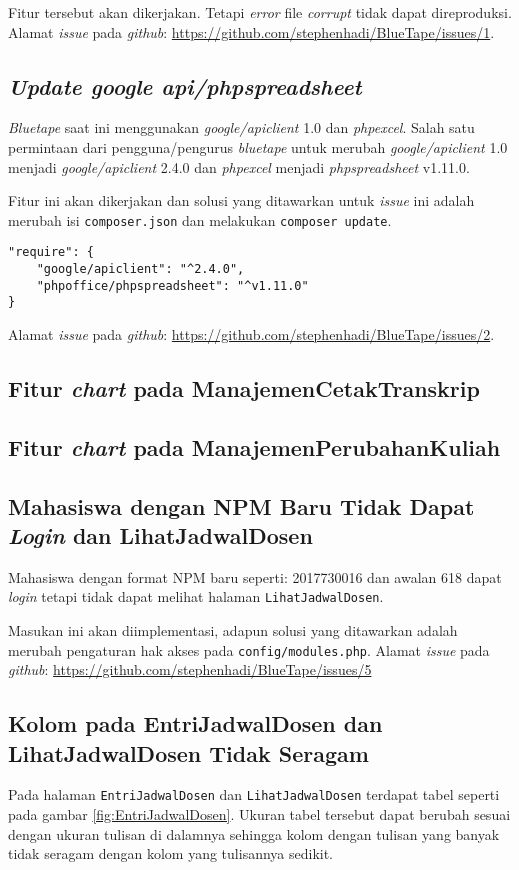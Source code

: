 Fitur tersebut akan dikerjakan. Tetapi \textit{error} file \textit{corrupt} tidak dapat direproduksi. Alamat \textit{issue} pada \textit{github}: \url{https://github.com/stephenhadi/BlueTape/issues/1}. 

\subsection{\textit{Update google api/phpspreadsheet}}
\label{issue:2}
\textit{Bluetape} saat ini menggunakan \textit{google/apiclient} 1.0 dan \textit{phpexcel}. Salah satu permintaan dari pengguna/pengurus \textit{bluetape} untuk merubah \textit{google/apiclient} 1.0 menjadi \textit{google/apiclient} 2.4.0 dan \textit{phpexcel} menjadi \textit{phpspreadsheet} v1.11.0. 

Fitur ini akan dikerjakan dan solusi yang ditawarkan untuk \textit{issue} ini adalah merubah isi \texttt{composer.json} dan melakukan \texttt{composer update}.
\begin{lstlisting}
"require": {
	"google/apiclient": "^2.4.0",
	"phpoffice/phpspreadsheet": "^v1.11.0"
}
\end{lstlisting}

Alamat \textit{issue} pada \textit{github}: \url{https://github.com/stephenhadi/BlueTape/issues/2}. 
\subsection{Fitur \textit{chart} pada ManajemenCetakTranskrip}
\label{issue:3}

\subsection{Fitur \textit{chart} pada ManajemenPerubahanKuliah}
\label{issue:4}
\subsection{Mahasiswa dengan NPM Baru Tidak Dapat \textit{Login} dan LihatJadwalDosen}
\label{issue:5}
Mahasiswa dengan format NPM baru seperti: 2017730016 dan awalan 618 dapat \textit{login} tetapi tidak dapat melihat halaman \texttt{LihatJadwalDosen}. 

Masukan ini akan diimplementasi, adapun solusi yang ditawarkan adalah merubah pengaturan hak akses pada \texttt{config/modules.php}. Alamat \textit{issue} pada \textit{github}: \url{https://github.com/stephenhadi/BlueTape/issues/5} 

\subsection{Kolom pada EntriJadwalDosen dan LihatJadwalDosen Tidak Seragam}
\label{issue:6} 
Pada halaman \texttt{EntriJadwalDosen} dan \texttt{LihatJadwalDosen} terdapat tabel seperti pada gambar \ref{fig:EntriJadwalDosen}. Ukuran tabel tersebut dapat berubah sesuai dengan ukuran tulisan di dalamnya sehingga kolom dengan tulisan yang banyak tidak seragam dengan kolom yang tulisannya sedikit.

